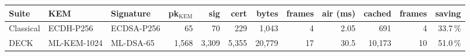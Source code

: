 \begin{adjustbox}{max width=\linewidth}
\begin{tabular}{lllrrrrrrrrr}
\toprule
Suite & KEM & Signature & pk$_\text{KEM}$ & sig & cert & bytes & frames & air (ms) & cached & frames & saving \\
\midrule
Classical & ECDH-P256 & ECDSA-P256 & 65 & 70 & 229 & 1{,}043 & 4 & 2.05 & 691 & 4 & 33.7\,\% \\
DECK & ML-KEM-1024 & ML-DSA-65 & 1{,}568 & 3{,}309 & 5{,}355 & 20{,}779 & 17 & 30.5 & 10{,}173 & 10 & 51.0\,\% \\
\bottomrule
\end{tabular}
\end{adjustbox}
